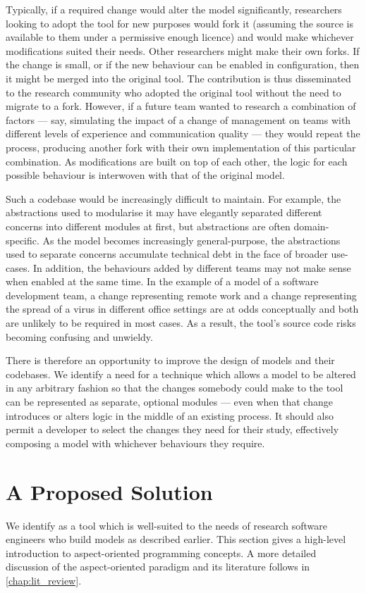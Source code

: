Typically, if a required change would alter the model significantly, researchers
looking to adopt the tool for new purposes would fork it (assuming the source is
available to them under a permissive enough licence) and would make whichever
modifications suited their needs. Other researchers might make their own forks.
If the change is small, or if the new behaviour can be enabled in configuration,
then it might be merged into the original tool. The contribution is thus
disseminated to the research community who adopted the original tool without the
need to migrate to a fork. However, if a future team wanted to research a
combination of factors --- say, simulating the impact of a change of management
on teams with different levels of experience and communication quality --- they
would repeat the process, producing another fork with their own implementation
of this particular combination. As modifications are built on top of each other,
the logic for each possible behaviour is interwoven with that of the original
model.

Such a codebase would be increasingly difficult to maintain. For example, the
abstractions used to modularise it may have elegantly separated different
concerns into different modules at first, but abstractions are often
domain-specific. As the model becomes increasingly general-purpose, the
abstractions used to separate concerns accumulate technical debt in the face of
broader use-cases. In addition, the behaviours added by different teams may not
make sense when enabled at the same time. In the example of a model of a
software development team, a change representing remote work and a change
representing the spread of a virus in different office settings are at odds
conceptually and both are unlikely to be required in most cases. As a result,
the tool's source code risks becoming confusing and unwieldy.

There is therefore an opportunity to improve the design of models and their
codebases. We identify a need for a technique which allows a model to be altered
in any arbitrary fashion so that the changes somebody could make to the tool can
be represented as separate, optional modules --- even when that change
introduces or alters logic in the middle of an existing process. It should also
permit a developer to select the changes they need for their study, effectively
composing a model with whichever behaviours they require.



\section{A Proposed Solution}
\label{intro_proposed_solution}
We identify \aop{} as a tool which is well-suited to the
needs of research software engineers who build models as described earlier. This
section gives a high-level introduction to aspect-oriented programming concepts.
A more detailed discussion of the aspect-oriented
paradigm and its literature follows in \cref{chap:lit_review}.

